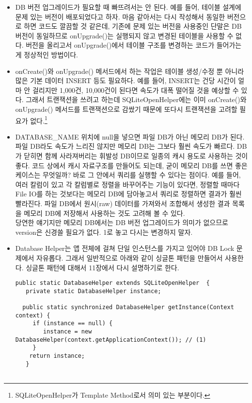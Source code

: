 \begin{itemize}
\item DB 버전 업그레이드가 필요할 때 빠뜨려서는 안 된다. 예를 들어, 테이블 설계에 문제 있는 버전이 배포되었다고 하자.
마음 같아서는 다시 작성해서 동일한 버전으로 하면 코드도 깔끔할 것 같은데, 기존에 문제 있는 버전을 사용중인 단말은 DB 버전이 동일하므로 onUpgrade()는 실행되지 않고 변경된 테이블을 사용할 수 없다.
버전을 올리고서 onUpgrade()에서 테이블 구조를 변경하는 코드가 들어가는 게 정상적인 방법이다.

\item onCreate()와 onUpgrade() 메서드에서 하는 작업은 테이블 생성/수정 뿐 아니라 많은 기본 데이터 INSERT 등도 필요하다. 
예를 들어, INSERT는 건당 시간이 얼마 안 걸리지만 1,000건, 10,000건이 된다면 속도가 대폭 떨어질 것을 예상할 수 있다.
그래서 트랜잭션을 쓰려고 하는데 SQLiteOpenHelper에는 이미 onCreate()와 onUpgrade() 메서드를 트랜잭션으로 감쌌기 때문에 또다시 트랜잭션을 고려할 필요가 없다.\footnote{SQLiteOpenHelper가 Template Method로서 의미 있는 부분이다.}

\item DATABASE\_NAME 위치에 null을 넣으면 파일 DB가 아닌 메모리 DB가 된다. 파일 DB라도 속도가 느리진 않지만 메모리 DB는 그보다 훨씬 속도가 빠르다. 
DB가 닫히면 함께 사라져버리는 휘발성 DB이므로 일종의 캐시 용도로 사용하는 것이 좋다.
코드 상에서 캐시 자료구조를 만들어도 되는데, 굳이 메모리 DB를 쓰면 좋은 케이스는 무엇일까? 바로 그 안에서 쿼리를 실행할 수 있다는 점이다.
예를 들어, 여러 칼럼이 있고 각 칼럼별로 정렬을 바꾸어주는 기능이 있다면, 정렬할 때마다 File IO를 하는 것보다는 메모리 DB에 담아놓고서 쿼리로 정렬하면 결과가 훨씬 빨라진다. 
파일 DB에서 원시(raw) 데이터를 가져와서 조합해서 생성한 결과 목록을 메모리 DB에 저장해서 사용하는 것도 고려해 볼 수 있다.\\

당연한 얘기지만 메모리 DB에서는 DB 버전 업그레이드가 의미가 없으므로 version은 신경쓸 필요가 없다. 1로 놓고 다시는 변경하지 말자.

\item Database Helper는 앱 전체에 걸쳐 단일 인스턴스를 가지고 있어야 DB Lock 문제에서 자유롭다. 
그래서 일반적으로 아래와 같이 싱글톤 패턴을 만들어서 사용한다. 싱글톤 패턴에 대해서 11장에서 다시 설명하기로 한다.
\begin{lstlisting}[frame=single] 
public static DatabaseHelper extends SQLiteOpenHelper  {
   private static DatabaseHelper instance;
 
  public static synchronized DatabaseHelper getInstance(Context context) {
     if (instance == null) {
        instance = new DatabaseHelper(context.getApplicationContext()); // (1)
     }
    return instance;
   }
 

\end{lstlisting}
\end{itemize}
